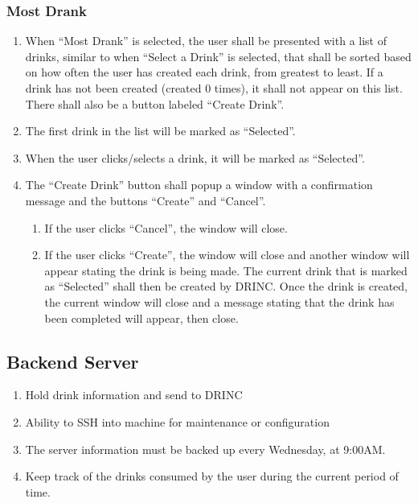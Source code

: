 {\subsubsection{Most Drank}
\begin{enumerate}
	\item When ``Most Drank'' is selected, the user shall be presented with a list of drinks, similar to when ``Select a Drink'' is selected, that shall be sorted based on how often the user has created each drink, from greatest to least. If a drink has not been created (created 0 times), it shall not appear on this list. There shall also be a button labeled ``Create Drink''.
	\item The first drink in the list will be marked as ``Selected''.
	\item When the user clicks/selects a drink, it will be marked as ``Selected''.
	\item The ``Create Drink'' button shall popup a window with a confirmation message and the buttons ``Create'' and ``Cancel''.
	\begin{enumerate}
		\item If the user clicks ``Cancel'', the window will close.	
		\item If the user clicks ``Create'', the window will close and another window will appear stating the drink is being made. The current drink that is marked as ``Selected'' shall then be created by DRINC. Once the drink is created, the current window will close and a message stating that the drink has been completed will appear, then close.
	\end{enumerate}
\end{enumerate}

\subsection{Backend Server}

\begin{enumerate}
	\item Hold drink information and send to DRINC
    \item Ability to SSH into machine for maintenance or configuration
    \item The server information must be backed up every Wednesday, at 9:00AM.
    \item Keep track of the drinks consumed by the user during the current period of time.
\end{enumerate}
}
